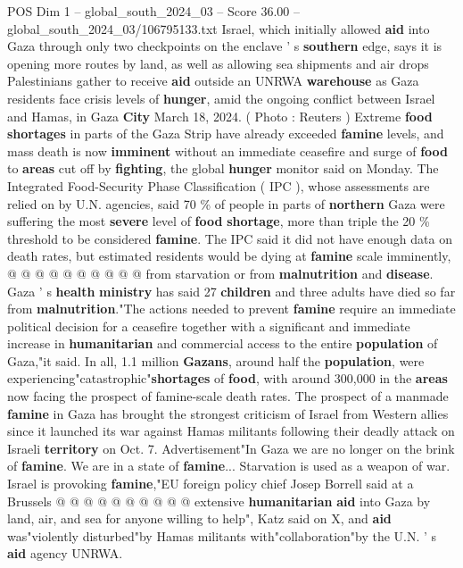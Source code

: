 \begin{textsample}{POS Dim 1 – global\_south\_2024\_03 – Score 36.00 – global\_south\_2024\_03/106795133.txt}  \label{ex:f1_pos_006}
Israel, which initially allowed \textbf{aid} into Gaza through only two checkpoints on the enclave ' s \textbf{southern} edge, says it is opening more routes by land, as well as allowing sea shipments and air drops Palestinians gather to receive \textbf{aid} outside an UNRWA \textbf{warehouse} as Gaza residents face crisis levels of \textbf{hunger}, amid the ongoing conflict between Israel and Hamas, in Gaza \textbf{City} March 18, 2024. ( Photo : Reuters ) Extreme \textbf{food} \textbf{shortages} in parts of the Gaza Strip have already exceeded \textbf{famine} levels, and mass death is now \textbf{imminent} without an immediate ceasefire and surge of \textbf{food} to \textbf{areas} cut off by \textbf{fighting}, the global \textbf{hunger} monitor said on Monday.
The Integrated Food-Security Phase Classification ( IPC ), whose assessments are relied on by U.N. agencies, said 70 \% of people in parts of \textbf{northern} Gaza were suffering the most \textbf{severe} level of \textbf{food} \textbf{shortage}, more than triple the 20 \% threshold to be considered \textbf{famine}.
The IPC said it did not have enough data on death rates, but estimated residents would be dying at \textbf{famine} scale imminently, @ @ @ @ @ @ @ @ @ @ from starvation or from \textbf{malnutrition} and \textbf{disease}.
Gaza ' s \textbf{health} \textbf{ministry} has said 27 \textbf{children} and three adults have died so far from \textbf{malnutrition}."The actions needed to prevent \textbf{famine} require an immediate political decision for a ceasefire together with a significant and immediate increase in \textbf{humanitarian} and commercial access to the entire \textbf{population} of Gaza,"it said.
In all, 1.1 million \textbf{Gazans}, around half the \textbf{population}, were experiencing"catastrophic"\textbf{shortages} of \textbf{food}, with around 300,000 in the \textbf{areas} now facing the prospect of famine-scale death rates.
The prospect of a manmade \textbf{famine} in Gaza has brought the strongest criticism of Israel from Western allies since it launched its war against Hamas militants following their deadly attack on Israeli \textbf{territory} on Oct. 7.
Advertisement"In Gaza we are no longer on the brink of \textbf{famine}.
We are in a state of \textbf{famine}...
Starvation is used as a weapon of war.
Israel is provoking \textbf{famine},"EU foreign policy chief Josep Borrell said at a Brussels @ @ @ @ @ @ @ @ @ @ extensive \textbf{humanitarian} \textbf{aid} into Gaza by land, air, and sea for anyone willing to help", Katz said on X, and \textbf{aid} was"violently disturbed"by Hamas militants with"collaboration"by the U.N. ' s \textbf{aid} agency UNRWA.

\end{textsample}
